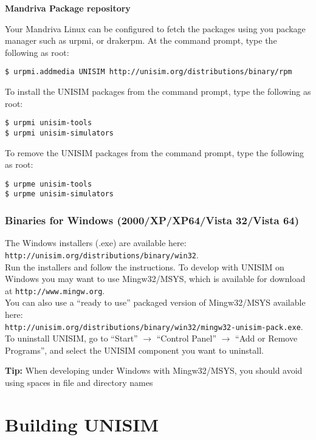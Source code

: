 \noindent \textbf{Mandriva Package repository}

Your Mandriva Linux can be configured to fetch the packages using you package manager such as urpmi, or drakerpm.
At the command prompt, type the following as root:

\begin{verbatim}
$ urpmi.addmedia UNISIM http://unisim.org/distributions/binary/rpm
\end{verbatim}

To install the UNISIM packages from the command prompt, type the following as root:

\begin{verbatim}
$ urpmi unisim-tools
$ urpmi unisim-simulators
\end{verbatim}

To remove the UNISIM packages from the command prompt, type the following as root:

\begin{verbatim}
$ urpme unisim-tools
$ urpme unisim-simulators
\end{verbatim}

\subsubsection{Binaries for Windows (2000/XP/XP64/Vista 32/Vista 64)}

The Windows installers (.exe) are available here:\\
\texttt{http://unisim.org/distributions/binary/win32}.\\
Run the installers and follow the instructions.
To develop with UNISIM on Windows you may want to use Mingw32/MSYS, which is available for download at \texttt{http://www.mingw.org}.\\
You can also use a “ready to use” packaged version of Mingw32/MSYS available here:\\
\texttt{http://unisim.org/distributions/binary/win32/mingw32-unisim-pack.exe}.\\
To uninstall UNISIM, go to “Start” $\rightarrow$ “Control Panel” $\rightarrow$ “Add or Remove Programs”, and select the UNISIM component you want to uninstall.

\noindent \textbf{Tip:} When developing under Windows with Mingw32/MSYS, you should avoid using spaces in file and directory names

\section{Building UNISIM}

